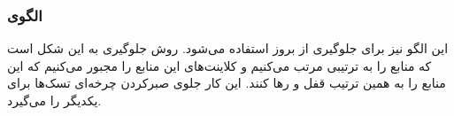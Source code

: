 \subsubsection{الگوی }
\label{scheduleOrderedSec}
\begin{RTL}
این الگو نیز برای جلوگیری از بروز  استفاده می‌شود.
روش جلوگیری به این شکل است که منابع را به ترتیبی مرتب می‌کنیم و
کلاینت‌های این منابع را مجبور می‌کنیم که این منابع را به همین ترتیب قفل و
رها کنند. این کار جلوی صبرکردن چرخه‌ای تسک‌ها برای یکدیگر را می‌گیرد.
\end{RTL}